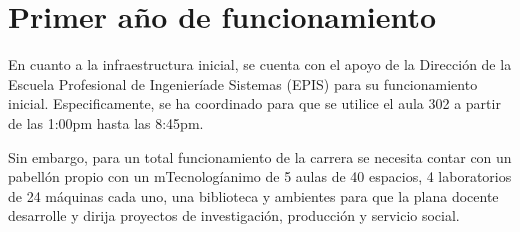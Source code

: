 \section{Primer año de funcionamiento}

En cuanto a la infraestructura inicial, se cuenta con el apoyo de la Dirección de la Escuela Profesional de Ingenieríade Sistemas (EPIS) para su funcionamiento inicial. Especificamente, se ha coordinado para que se utilice el aula 302 a partir de las 1:00pm hasta las 8:45pm.

Sin embargo, para un total funcionamiento de la carrera se necesita contar con un pabellón propio con un mTecnologíanimo de 5 aulas de 40 espacios, 4 laboratorios de 24 máquinas cada uno, una biblioteca y ambientes para que la plana docente desarrolle y dirija proyectos de investigación, producción y servicio social.

